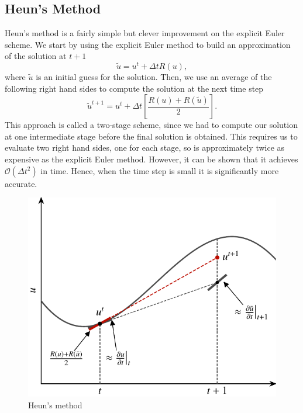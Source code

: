 \subsection{Heun's Method}
Heun's method is a fairly simple but clever improvement on the explicit Euler scheme. We start by using the explicit Euler method to build an approximation of the solution at $t+1$
\begin{equation}
	\tilde{u} = u^t + \Delta t R(u),
\end{equation}
where $\tilde{u}$ is an initial guess for the solution. Then, we use an average of the following right hand sides to compute the solution at the next time step
\begin{equation}
	\tilde{u}^{t+1} = u^t + \Delta t \left[\frac{R(u) + R(\tilde{u})}{2} \right].
\end{equation}
This approach is called a two-stage scheme, since we had to compute our solution at one intermediate stage before the final solution is obtained. This requires us to evaluate two right hand sides, one for each stage, so is approximately twice as expensive as the explicit Euler method. However, it can be shown that it achieves $\mathcal{O}(\Delta t^2)$ in time. Hence, when the time step is small it is significantly more accurate.
\begin{figure}[htbp]
	\centering
	\includegraphics[width=0.6\linewidth]{Pictures/ch15_heuns_method}
	\caption{Heun's method}
	\label{fig:heuns_method}
\end{figure}

